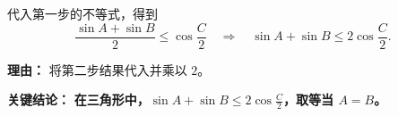 \begin{examplebox}
\begin{description}[style=nextline, leftmargin=2.8em, labelsep=0.5em, itemsep=0.45em]
    \item[\textbf{第三步（结合得证）：}] 代入第一步的不等式，得到
    \[
    \frac{\sin A + \sin B}{2} \leq \cos\frac{C}{2} \quad \Rightarrow \quad \sin A + \sin B \leq 2 \cos\frac{C}{2}.
    \]
    \par\textbf{理由：} 将第二步结果代入并乘以 $2$。
\end{description}

\textbf{\textcolor{CExample}{关键结论：}} \textbf{在三角形中，$\sin A + \sin B \leq 2 \cos\frac{C}{2}$，取等当 $A=B$。}
\end{examplebox}
